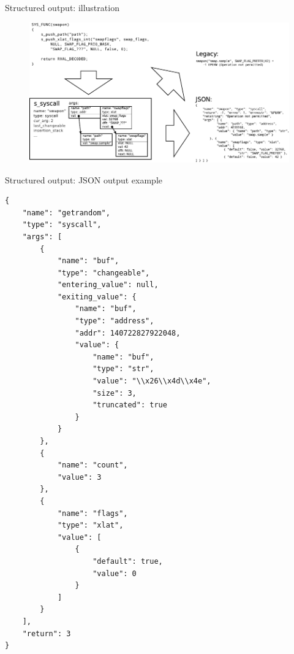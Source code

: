 \documentclass[unicode,aspectratio=169]{beamer}
\begin{document}
\begin{frame}{Structured output: illustration}
\begin{figure}[h]
      \includegraphics[width=\textwidth]{lp0-structured}
\end{figure}
\end{frame}

\begin{frame}[fragile]{Structured output: JSON output example}
\begin{scriptsize}
\begin{multicols}{2}
\begin{verbatim}
{
    "name": "getrandom",
    "type": "syscall",
    "args": [
        {
            "name": "buf",
            "type": "changeable",
            "entering_value": null,
            "exiting_value": {
                "name": "buf",
                "type": "address",
                "addr": 140722827922048,
                "value": {
                    "name": "buf",
                    "type": "str",
                    "value": "\\x26\\x4d\\x4e",
                    "size": 3,
                    "truncated": true
                }
            }
        },
        {
            "name": "count",
            "value": 3
        },
        {
            "name": "flags",
            "type": "xlat",
            "value": [
                {
                    "default": true,
                    "value": 0
                }
            ]
        }
    ],
    "return": 3
}
\end{verbatim}
\end{multicols}
\end{scriptsize}
\end{frame}
\end{document}
